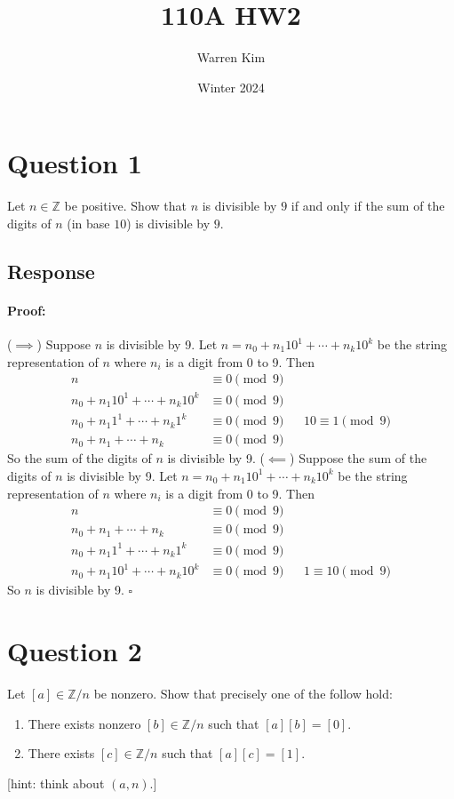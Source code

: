 \documentclass [12pt] {article}
\title{110A HW2}
\author{Warren Kim}
\date{Winter 2024}
\newcommand{\Z}{\mathbb{Z}}
\newenvironment{proof}{\paragraph{Proof:}}{\hfill$\square$}
\begin{document}
\maketitle

\section*{Question 1}
Let $n\in\Z$ be positive. Show that $n$ is divisible by $9$ if and only if the sum of the digits of $n$ (in base $10$) is divisible by $9$. 

\subsection*{Response}
\begin{proof}
    ($\implies$) Suppose $n$ is divisible by 9. Let 
    $n = n_0 + n_1 10^1 + \cdots + n_k 10^k$ be the string representation of $n$ where $n_i$ is a
    digit from 0 to 9. Then
    \begin{align*}
        n &\equiv 0 \pmod{9} \\
        n_0 + n_1 10^1 + \cdots + n_k 10^k &\equiv 0 \pmod{9} \\
        n_0 + n_1 1^1 + \cdots + n_k 1^k &\equiv 0 \pmod{9} && 10 \equiv 1 \pmod{9} \\
        n_0 + n_1 + \cdots + n_k &\equiv 0 \pmod{9}
    \end{align*}
    So the sum of the digits of $n$ is divisible by 9.
    \newline
    ($\impliedby$) Suppose the sum of the digits of $n$ is divisible by 9. Let
    $n = n_0 + n_1 10^1 + \cdots + n_k 10^k$ be the string representation of $n$ where $n_i$ is a
    digit from 0 to 9. Then
    \begin{align*}
        n &\equiv 0 \pmod{9} \\
        n_0 + n_1 + \cdots + n_k &\equiv 0 \pmod{9} \\
        n_0 + n_1 1^1 + \cdots + n_k 1^k &\equiv 0 \pmod{9} \\
        n_0 + n_1 10^1 + \cdots + n_k 10^k &\equiv 0 \pmod{9} && 1 \equiv 10 \pmod{9} 
    \end{align*}
    So $n$ is divisible by 9.
\end{proof}
\newpage

\section*{Question 2}
Let $[a]\in\Z/n$ be nonzero. Show that precisely one of the follow hold: 
\begin{enumerate}
    \item There exists nonzero $[b]\in\Z/n$ such that $[a][b]=[0]$.
    \item There exists $[c]\in\Z/n$ such that $[a][c]=[1]$.
\end{enumerate}
[hint: think about $(a,n)$.]
\end{document}
